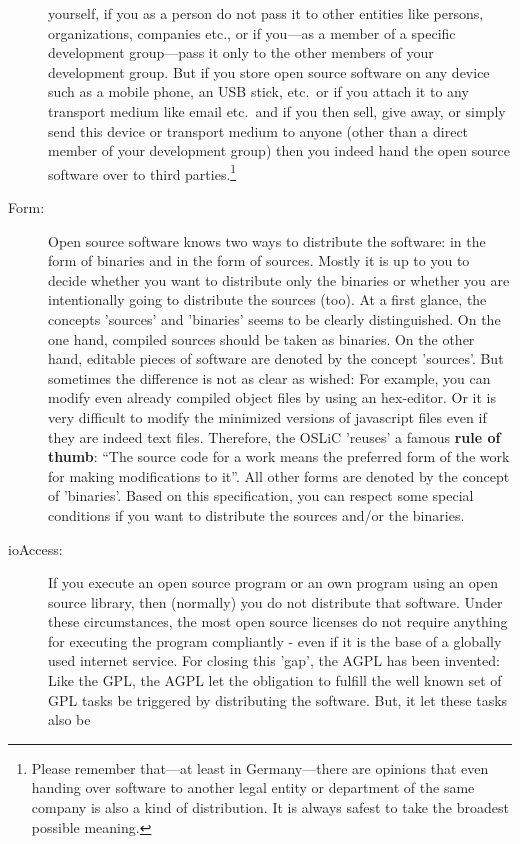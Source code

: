 \begin{description}
yourself, if you as a person do not pass it to other entities like persons,
organizations, companies etc., or if you---as a member of a specific
development group---pass it only to the other members of your development
group. But if you store open source software on any device such as a mobile
phone, an USB stick, etc.\ or if you attach it to any transport medium like
email etc.\ and if you then sell, give away, or simply send this device or
transport medium to anyone (other than a direct member of your development
group) then you indeed hand the open source software over to third
parties.\footnote{Please remember that---at least in Germany---there are
opinions that even handing over software to another legal entity or department
of the same company is also a kind of distribution. It is always safest to take
the broadest possible meaning.}
\item[Form:] Open source software knows two ways to distribute the software: in
the form of binaries and in the form of sources. Mostly it is up to you to
decide whether you want to distribute only the binaries or whether you are
intentionally going to distribute the sources (too). At a first glance, the
concepts 'sources' and 'binaries' seems to be clearly distinguished.
On the one hand, compiled sources should be taken as binaries. On the other
hand, editable pieces of software are denoted by the concept 'sources'. But
sometimes the difference is not as clear as wished: For example, you can modify
even already compiled object files by using an hex-editor. Or it is very
difficult to modify the minimized versions of javascript files even if they are
indeed text files. Therefore, the OSLiC 'reuses' a famous \textbf{rule of
thumb}: \enquote{The source code for a work means the preferred form of the work
for making modifications to it}. All other forms are denoted by
the concept of 'binaries'. Based on this specification, you can respect some
special conditions if you want to distribute the sources and/or the binaries.
\item[ioAccess:] If you execute an open source program or an own program using
an open source library, then (normally) you do not distribute that software.
Under these circumstances, the most open source licenses do not require anything
for executing the program compliantly - even if it is the base of a globally
used internet service. For closing this 'gap', the AGPL has been invented: Like
the GPL, the AGPL let the obligation to fulfill the well known set of GPL tasks
be triggered by distributing the software. But, it let these tasks also be

\end{description}
